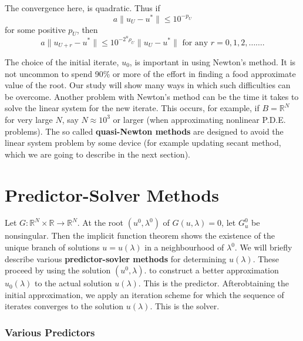 \begin{note*}
The convergence here, is quadratic. Thus if 
$$
a\| u_U - u^* \| \leq 10^{-p_U}
$$
for some positive $p_U$, then 
$$
a\| u_{U+r}-u^*\| \leq 10^{-2^u \rho_U } \| u_U - u^* \| \text { for 
  any } r = 0, 1,2, \ldots\ldots.  
$$
\end{note*}

The choice of  the initial iterate, $u_0$, is important in using
Newton's method. It is not uncommon to spend 90\% or more of the
effort in finding a food approximate value of the root. Our study will
show many ways in which such difficulties can be overcome. Another
problem with Newton's method can be the time it takes to solve
the linear system for the new iterate. This occurs, for example, if
$B = \mathbb{R}^N$ for very large $N$, say $N \approx 10^3$ or larger (when
approximating nonlinear P.D.E. problems). The so called
\textbf{quasi-Newton methods} are designed to avoid the linear system
problem by some device (for example updating secant method, which we
are going to describe in the next section). 


\setcounter{section}{26}
\section{Predictor-Solver Methods}\label{chap2-sec2.27}%

Let $G: \mathbb{R}^N \times \mathbb{R} \to \mathbb{R}^N$. At the root $(u^0,
\lambda^0)$ of $G(u, \lambda) = 0 $, let $G^0_{u}$ be
nonsingular. Then the implicit function theorem shows the existence of
the unique branch of solutions $u = u(\lambda)$ in a neighbourhood of
$\lambda^0$. We will briefly describe various \textbf{predictor-sovler
  methods} for determining $u (\lambda)$. These proceed by using the
solution $(u^0, \lambda)$. to construct a better approximation
$u_0(\lambda)$ to the actual solution $u(\lambda)$. This is the
predictor.  
After\pageoriginale obtaining the initial approximation, we apply an iteration
scheme for which the sequence of iterates converges to the solution
$u(\lambda)$. This is the solver. 

\subsubsection*{Various Predictors}


